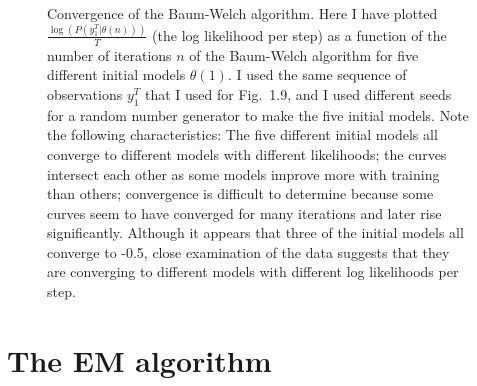 \documentclass[prelim,showlabels]{book}
\newcommand{\parameters}{\theta}
\newcommand{\ti}[2]{{#1}{(#2)}}                  %
\newcommand{\ts}[3]{#1_{#2}^{#3}}                    %
\begin{document}
\begin{figure}
  \caption[Convergence of the Baum-Welch algorithm.]{%
    Convergence of the Baum-Welch algorithm.  Here I have plotted
    $\frac{\log \left( P \left(\ts{y}{1}{T}|\ti{\parameters}{n}
        \right)\right)}{T}$ (the log likelihood per step) as a
    function of the number of iterations $n$ of the Baum-Welch
    algorithm for five different initial models $\ti{\parameters}{1}$.
    I used the same sequence of observations $\ts{y}{1}{T}$ that I
    used for Fig.~1.9, and I used different seeds for a random number
    generator to make the five initial models.  Note the following
    characteristics: The five different initial models all converge to
    different models with different likelihoods; the curves intersect
    each other as some models improve more with training than others;
    convergence is difficult to determine because some curves seem to
    have converged for many iterations and later rise significantly.
    Although it appears that three of the initial models all converge
    to -0.5, close examination of the data suggests that they are
    converging to different models with different log likelihoods per
    step.}
  \label{fig:TrainChar}
\end{figure}

\section{The EM algorithm}
\label{sec:EM}
%
\end{document}
